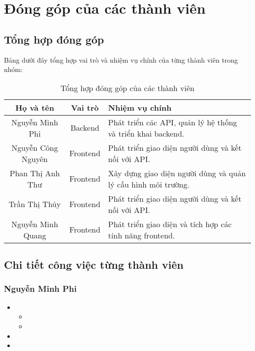 \chapter{Đóng góp của các thành viên}
\section{Tổng hợp đóng góp}
Bảng dưới đây tổng hợp vai trò và nhiệm vụ chính của từng thành viên trong nhóm:

\begin{table}[h!]
    \centering
    \begin{tabular}{|c|c|p{10cm}|}
        \hline
        \textbf{Họ và tên} & \textbf{Vai trò} & \textbf{Nhiệm vụ chính} \\
        \hline
        Nguyễn Minh Phi & Backend & Phát triển các API, quản lý hệ thống và triển khai backend. \\
        \hline
        Nguyễn Công Nguyên & Frontend & Phát triển giao diện người dùng và kết nối với API. \\
        \hline
        Phan Thị Anh Thư & Frontend & Xây dựng giao diện người dùng và quản lý cấu hình môi trường. \\
        \hline
        Trần Thị Thủy & Frontend & Phát triển giao diện người dùng và kết nối với API. \\
        \hline
        Nguyễn Minh Quang & Frontend & Phát triển giao diện và tích hợp các tính năng frontend. \\
        \hline
    \end{tabular}
    \caption{Tổng hợp đóng góp của các thành viên}
\end{table}

\section{Chi tiết công việc từng thành viên}
\subsection{Nguyễn Minh Phi}
\begin{itemize}
    \item 
    \begin{itemize}
        \item 
        \item 
    \end{itemize}
    \item 
    \item 
\end{itemize}
